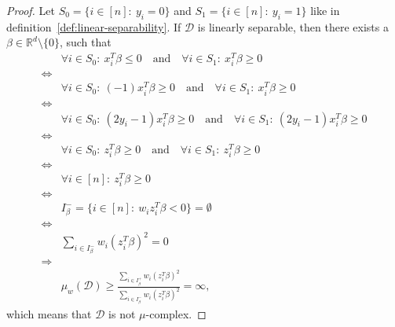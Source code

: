 \begin{proof}
    Let $S_0 = \{i \in [n]:\ y_i = 0\}$ and $S_1 = \{i \in [n]:\ y_i = 1\}$
    like in definition~\ref{def:linear-separability}.
    If $\mathcal{D}$ is linearly separable, then there exists
    a $\beta \in \mathbb{R}^d \setminus \{0\}$, such that
    \begin{align*}
                    & \forall i \in S_0:\ x_i^T \beta \leq 0\quad \text{and}\quad \forall i \in S_1:\ x_i^T \beta \geq 0                       \\
        \iff        &                                                                                                                          \\
                    & \forall i \in S_0:\ (-1) x_i^T \beta \geq 0\quad \text{and}\quad \forall i \in S_1:\ x_i^T \beta \geq 0                  \\
        \iff        &                                                                                                                          \\
                    & \forall i \in S_0:\ (2y_i - 1) x_i^T \beta \geq 0\quad \text{and}\quad \forall i \in S_1:\ (2y_i - 1) x_i^T \beta \geq 0 \\
        \iff        &                                                                                                                          \\
                    & \forall i \in S_0:\ z_i^T \beta \geq 0\quad \text{and}\quad \forall i \in S_1:\ z_i^T \beta \geq 0                       \\
        \iff        &                                                                                                                          \\
                    & \forall i \in [n]:\ z_i^T\beta \geq 0                                                                                    \\
        \iff        &                                                                                                                          \\
                    & I_\beta^- = \{ i \in [n]:\ w_iz_i^T\beta < 0\} = \emptyset                                                               \\
        \iff        &                                                                                                                          \\
                    & \sum_{i \in I_\beta^-} w_i (z_i^T \beta)^2 = 0                                                                           \\
        \Rightarrow &                                                                                                                          \\
                    & \mu_w(\mathcal{D}) \geq \frac{\sum_{i \in I_\beta^+} w_i (z_i^T \beta)^2}
        {\sum_{i \in I_\beta^-} w_i (z_i^T \beta)^2} = \infty,
    \end{align*}
    which means that $\mathcal{D}$ is not $\mu$-complex.


\end{proof}
